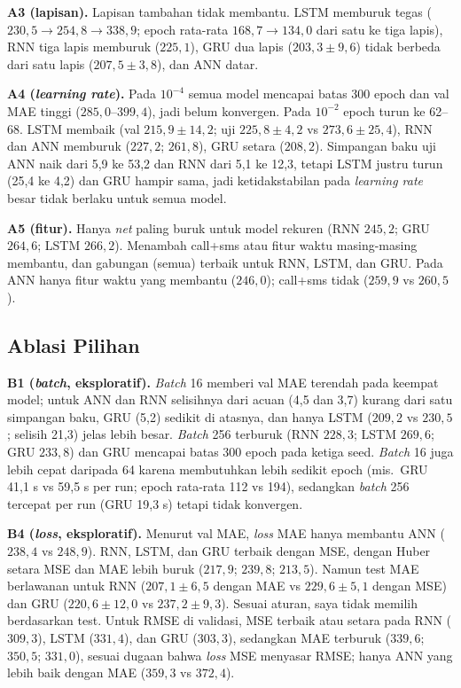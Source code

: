 \documentclass[conference,a4paper]{IEEEtran}
\begin{document}
\textbf{A3 (lapisan).} Lapisan tambahan tidak membantu. LSTM memburuk tegas ($230{,}5 \to 254{,}8 \to 338{,}9$; epoch rata-rata $168{,}7 \to 134{,}0$ dari satu ke tiga lapis), RNN tiga lapis memburuk ($225{,}1$), GRU dua lapis ($203{,}3 \pm 9{,}6$) tidak berbeda dari satu lapis ($207{,}5 \pm 3{,}8$), dan ANN datar.

\textbf{A4 (\textit{learning rate}).} Pada $10^{-4}$ semua model mencapai batas 300 epoch dan val MAE tinggi ($285{,}0$--$399{,}4$), jadi belum konvergen. Pada $10^{-2}$ epoch turun ke 62--68. LSTM membaik (val $215{,}9 \pm 14{,}2$; uji $225{,}8 \pm 4{,}2$ vs $273{,}6 \pm 25{,}4$), RNN dan ANN memburuk ($227{,}2$; $261{,}8$), GRU setara ($208{,}2$). Simpangan baku uji ANN naik dari 5,9 ke 53,2 dan RNN dari 5,1 ke 12,3, tetapi LSTM justru turun (25,4 ke 4,2) dan GRU hampir sama, jadi ketidakstabilan pada \textit{learning rate} besar tidak berlaku untuk semua model.

\textbf{A5 (fitur).} Hanya \textit{net} paling buruk untuk model rekuren (RNN $245{,}2$; GRU $264{,}6$; LSTM $266{,}2$). Menambah call+sms atau fitur waktu masing-masing membantu, dan gabungan (semua) terbaik untuk RNN, LSTM, dan GRU. Pada ANN hanya fitur waktu yang membantu ($246{,}0$); call+sms tidak ($259{,}9$ vs $260{,}5$).

\subsection{Ablasi Pilihan}
\textbf{B1 (\textit{batch}, eksploratif).} \textit{Batch} 16 memberi val MAE terendah pada keempat model; untuk ANN dan RNN selisihnya dari acuan (4,5 dan 3,7) kurang dari satu simpangan baku, GRU (5,2) sedikit di atasnya, dan hanya LSTM ($209{,}2$ vs $230{,}5$; selisih 21,3) jelas lebih besar. \textit{Batch} 256 terburuk (RNN $228{,}3$; LSTM $269{,}6$; GRU $233{,}8$) dan GRU mencapai batas 300 epoch pada ketiga seed. \textit{Batch} 16 juga lebih cepat daripada 64 karena membutuhkan lebih sedikit epoch (mis.\ GRU 41,1 s vs 59,5 s per run; epoch rata-rata 112 vs 194), sedangkan \textit{batch} 256 tercepat per run (GRU 19,3 s) tetapi tidak konvergen.

\textbf{B4 (\textit{loss}, eksploratif).} Menurut val MAE, \textit{loss} MAE hanya membantu ANN ($238{,}4$ vs $248{,}9$). RNN, LSTM, dan GRU terbaik dengan MSE, dengan Huber setara MSE dan MAE lebih buruk ($217{,}9$; $239{,}8$; $213{,}5$). Namun test MAE berlawanan untuk RNN ($207{,}1 \pm 6{,}5$ dengan MAE vs $229{,}6 \pm 5{,}1$ dengan MSE) dan GRU ($220{,}6 \pm 12{,}0$ vs $237{,}2 \pm 9{,}3$). Sesuai aturan, saya tidak memilih berdasarkan test. Untuk RMSE di validasi, MSE terbaik atau setara pada RNN ($309{,}3$), LSTM ($331{,}4$), dan GRU ($303{,}3$), sedangkan MAE terburuk ($339{,}6$; $350{,}5$; $331{,}0$), sesuai dugaan bahwa \textit{loss} MSE menyasar RMSE; hanya ANN yang lebih baik dengan MAE ($359{,}3$ vs $372{,}4$).
\end{document}
